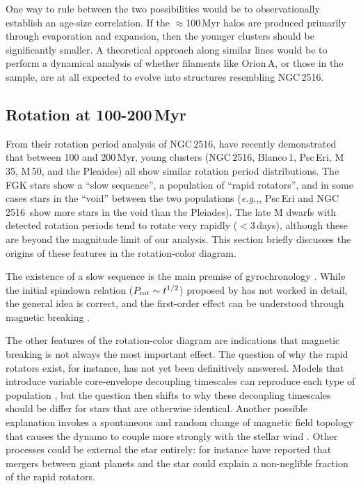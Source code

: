 \documentclass[12pt,twocolumn,tighten]{aastex63}
\newcommand{\cn}{NGC\,2516} %
\begin{document}
One way to rule between the two possibilities would be to
observationally establish an age-size correlation.  If the
$\approx$100\,Myr halos are produced primarily through evaporation and
expansion, then the younger clusters should be significantly smaller.
A theoretical approach along similar lines would be to perform a
dynamical analysis of whether filaments like Orion\,A, or those in the
\citet{zucker_physical_2018} sample, are at all expected to evolve
into structures resembling \cn.


\subsection{Rotation at 100-200\,Myr}
\label{disc:rotn}

From their rotation period analysis of \cn,
\citet{fritzewski_rotation_2020} have recently demonstrated that
between 100 and 200\,Myr, young clusters (\cn, Blanco\,1, Psc\,Eri,
M\,35, M\,50, and the Pleaides) all show similar rotation period
distributions.  The FGK stars show a ``slow sequence'', a population
of ``rapid rotators'', and in some cases stars in the ``void'' between
the two populations ({\it e.g.,}, Psc\,Eri and \cn\ show more stars in
the void than the Pleiades).  The late M dwarfs with detected rotation
periods tend to rotate very rapidly ($<3$\,days), although these are
beyond the magnitude limit of our analysis.  This section briefly
discusses the origins of these features in the rotation-color diagram.

The existence of a slow sequence is the main premise of gyrochronology
\citep[{\it e.g.},][]{barnes_rotational_2003}.  While the initial
spindown relation ($P_{\rm rot}\sim t^{1/2}$) proposed by
\citet{skumanich_time_1972} has not worked in detail, the general idea
is correct, and the first-order effect can be understood through
magnetic breaking \citep{weber_angular_1967}.

The other features of the rotation-color diagram are indications that
magnetic breaking is not always the most important effect.  The
question of why the rapid rotators exist, for instance, has not yet
been definitively answered.  Models that introduce variable
core-envelope decoupling timescales can reproduce each type of
population \citep{Irwin_NGC2516_2007}, but the question then shifts to
why these decoupling timescales should be differ for stars that are
otherwise identical.  Another possible explanation invokes a
spontaneous and random change of magnetic field topology that causes
the dynamo to couple more strongly with the stellar wind
\citep{brown_metastable_2014}.  Other processes could be external the
star entirely: \citet{qureshi_signature_2018} for instance have
reported that mergers between giant planets and the star could explain
a non-neglible fraction of the rapid rotators.
\end{document}

